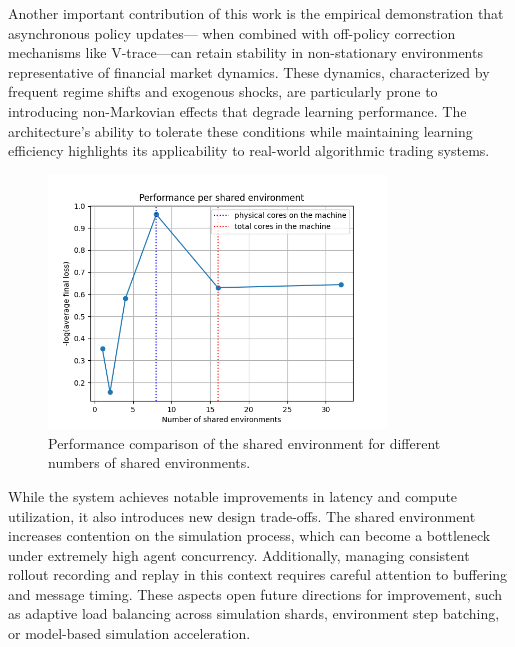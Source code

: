 Another important contribution of this work is the empirical demonstration that asynchronous policy updates---
when combined with off-policy correction mechanisms like V-trace---can retain stability in non-stationary environments representative of financial market dynamics.
These dynamics, characterized by frequent regime shifts and exogenous shocks, are particularly prone to introducing non-Markovian effects that degrade learning performance.
The architecture’s ability to tolerate these conditions while maintaining learning efficiency highlights its applicability to real-world algorithmic trading systems.

\begin{figure}
    \centering
    \includegraphics[width=0.8\textwidth]{images/results/performance}
    \caption{Performance comparison of the shared environment for different numbers of shared environments.}
    \label{fig:performance}
\end{figure}

While the system achieves notable improvements in latency and compute utilization, it also introduces new design trade-offs.
The shared environment increases contention on the simulation process, which can become a bottleneck under extremely high agent concurrency.
Additionally, managing consistent rollout recording and replay in this context requires careful attention to buffering and message timing.
These aspects open future directions for improvement, such as adaptive load balancing across simulation shards, environment step batching,
or model-based simulation acceleration.

